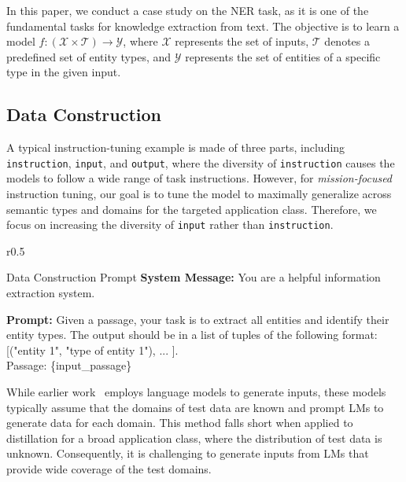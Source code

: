 In this paper, we conduct a case study on the NER task, as it is one of the fundamental tasks for knowledge extraction from text.
The objective is to learn a model $f: (\mathcal{X} \times \mathcal{T})\rightarrow \mathcal{Y}$, where $\mathcal{X}$ represents the set of inputs, $\mathcal{T}$ denotes a predefined set of entity types, and $\mathcal{Y}$ represents the set of entities of a specific type in the given input.

\subsection{Data Construction}
A typical instruction-tuning example is made of three parts, including \texttt{instruction}, \texttt{input}, and \texttt{output}, where the diversity of \texttt{instruction} %
causes the models to follow
a wide range of task instructions.
However, for \emph{mission-focused} instruction tuning, our goal is to tune the model to maximally generalize across semantic types and domains for the targeted application class.
Therefore, we focus on increasing the diversity of \texttt{input} rather than \texttt{instruction}.

\begin{wrapfigure}[16]{r}{0.5\textwidth}
    \vspace{-10pt}
    \begin{AIboxSmall}{\footnotesize Data Construction Prompt}
    \footnotesize
    \textbf{System Message:} You are a helpful information extraction system.
    
    \textbf{Prompt:} Given a passage, your task is to extract all entities and identify their entity types. The output should be in a list of tuples of the following format: [("entity 1", "type of entity 1"), ... ].\\

Passage: \{input\_passage\}
    \end{AIboxSmall}
    \caption{Data construction prompt for generating entity mentions and their types for a given passage.}
    \label{fig:prompt_ent_type_gen}
\end{wrapfigure}

While earlier work~\citep{jung2023impossible} employs language models to generate inputs, these models typically assume that the domains of test data are known and prompt LMs to generate data for each domain.
This method falls short when applied to distillation for a broad application class, where the distribution of test data is unknown.
Consequently, it is challenging to generate inputs from LMs that provide wide coverage of the test domains.

